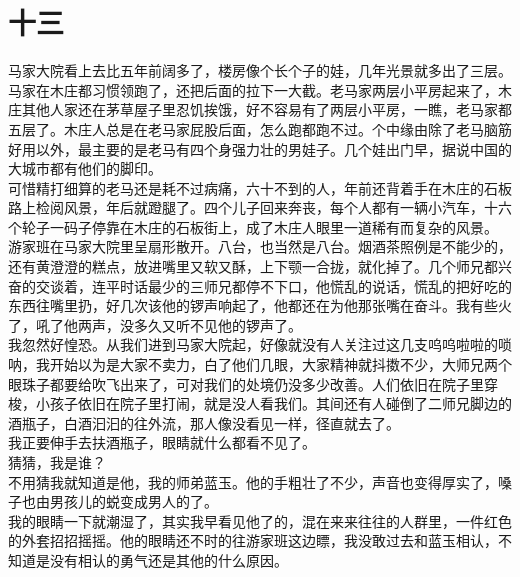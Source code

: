 \fancyhead[RO]{\thepage} %
\fancyhead[LE]{\thepage} %
\fancyfoot[LE,RO]{}
\fancyfoot[LO,CE]{}
\fancyfoot[CO,RE]{}
\chapter*{十三}
马家大院看上去比五年前阔多了，楼房像个长个子的娃，几年光景就多出了三层。马家在木庄都习惯领跑了，还把后面的拉下一大截。老马家两层小平房起来了，木庄其他人家还在茅草屋子里忍饥挨饿，好不容易有了两层小平房，一瞧，老马家都五层了。木庄人总是在老马家屁股后面，怎么跑都跑不过。个中缘由除了老马脑筋好用以外，最主要的是老马有四个身强力壮的男娃子。几个娃出门早，据说中国的大城市都有他们的脚印。\\

可惜精打细算的老马还是耗不过病痛，六十不到的人，年前还背着手在木庄的石板路上检阅风景，年后就蹬腿了。四个儿子回来奔丧，每个人都有一辆小汽车，十六个轮子一码子停靠在木庄的石板街上，成了木庄人眼里一道稀有而复杂的风景。\\

游家班在马家大院里呈扇形散开。八台，也当然是八台。烟酒茶照例是不能少的，还有黄澄澄的糕点，放进嘴里又软又酥，上下颚一合拢，就化掉了。几个师兄都兴奋的交谈着，连平时话最少的三师兄都停不下口，他慌乱的说话，慌乱的把好吃的东西往嘴里扔，好几次该他的锣声响起了，他都还在为他那张嘴在奋斗。我有些火了，吼了他两声，没多久又听不见他的锣声了。\\

我忽然好惶恐。从我们进到马家大院起，好像就没有人关注过这几支呜呜啦啦的唢呐，我开始以为是大家不卖力，白了他们几眼，大家精神就抖擞不少，大师兄两个眼珠子都要给吹飞出来了，可对我们的处境仍没多少改善。人们依旧在院子里穿梭，小孩子依旧在院子里打闹，就是没人看我们。其间还有人碰倒了二师兄脚边的酒瓶子，白酒汩汩的往外流，那人像没看见一样，径直就去了。\\

我正要伸手去扶酒瓶子，眼睛就什么都看不见了。\\

猜猜，我是谁？\\

不用猜我就知道是他，我的师弟蓝玉。他的手粗壮了不少，声音也变得厚实了，嗓子也由男孩儿的蜕变成男人的了。\\

我的眼睛一下就潮湿了，其实我早看见他了的，混在来来往往的人群里，一件红色的外套招招摇摇。他的眼睛还不时的往游家班这边瞟，我没敢过去和蓝玉相认，不知道是没有相认的勇气还是其他的什么原因。\\

